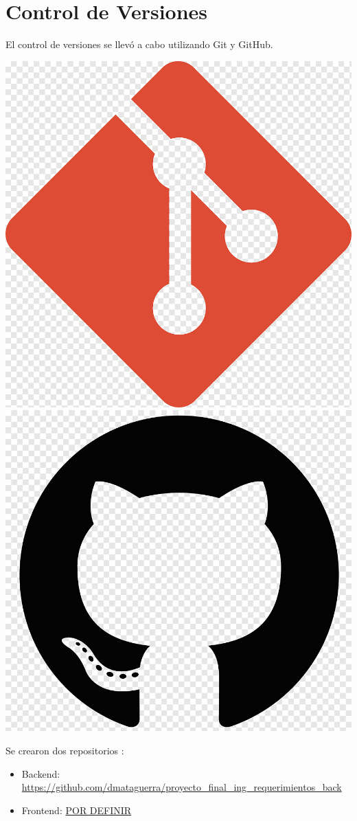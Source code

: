 	\section{Control de Versiones}
	El control de versiones se llevó a cabo utilizando Git y GitHub. 
		\begin{center}
		\includegraphics[width=0.3\linewidth]{./images/gitlogo.png}
		\includegraphics[width=0.3\linewidth]{./images/github_logo.png}
	\end{center}


	Se crearon dos repositorios :
	\begin{itemize}
		\item 	Backend: \url{https://github.com/dmataguerra/proyecto_final_ing_requerimientos_back}
		\item   Frontend: \url{POR DEFINIR}	
	\end{itemize}
